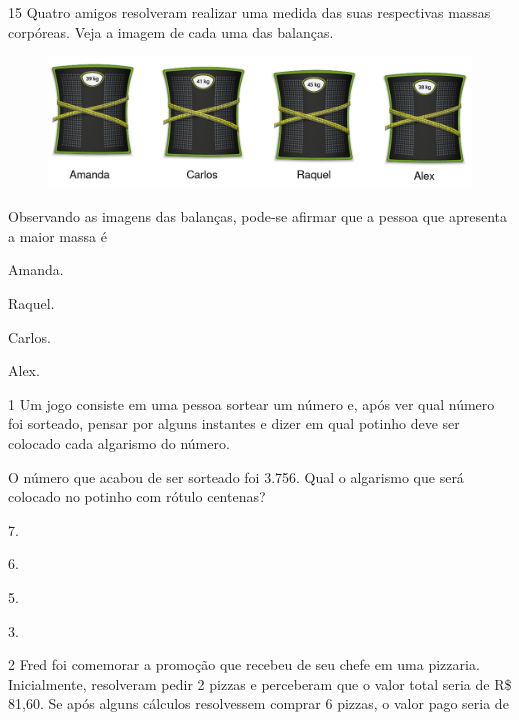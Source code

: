 \num{15} Quatro amigos resolveram realizar uma medida das suas respectivas massas corpóreas. Veja a imagem de cada uma das balanças.

\begin{figure}[htpb!]
\centering
\includegraphics[width=.8\textwidth]{./media/image113.png}
\end{figure}

Observando as imagens das balanças, pode-se afirmar que a pessoa que apresenta a maior massa é

\begin{escolha}
\item
  Amanda.
\item
  Raquel.
\item
  Carlos.
\item
  Alex.
\end{escolha}
\pagebreak

\vspace*{-3.4cm}

\pagebreak

\num{1} Um jogo consiste em uma pessoa sortear um número e, após ver qual número foi sorteado, pensar por alguns instantes e dizer em qual potinho deve ser colocado cada algarismo do número.


O número que acabou de ser sorteado foi 3.756. Qual o algarismo que será colocado no potinho com rótulo centenas?

\begin{escolha}
\item
  7.
\item
  6.
\item
  5.
\item
  3.
\end{escolha}

\num{2} Fred foi comemorar a promoção que recebeu de seu chefe em uma pizzaria. Inicialmente, resolveram pedir 2 pizzas e perceberam que o valor total seria de R\$ 81,60. Se após alguns cálculos resolvessem comprar 6
pizzas, o valor pago seria de


